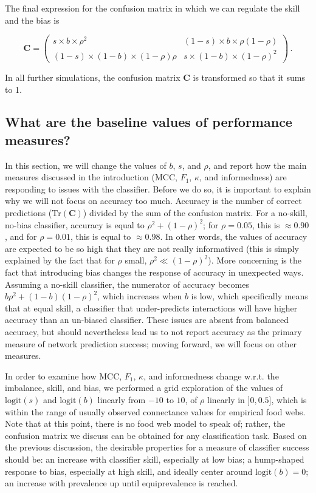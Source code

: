 \documentclass[11pt]{article}
\begin{document}
The final expression for the confusion matrix in which we can regulate
the skill and the bias is

\[
\mathbf{C} = \begin{pmatrix}
    s\times b\times \rho^2 & (1-s)\times b\times \rho (1-\rho) \\
    (1-s)\times (1-b)\times (1-\rho) \rho & s\times (1-b)\times (1-\rho)^2
\end{pmatrix} \,.
\]

In all further simulations, the confusion matrix \(\mathbf{C}\) is
transformed so that it sums to 1.

\hypertarget{what-are-the-baseline-values-of-performance-measures}{%
\subsection{What are the baseline values of performance
measures?}\label{what-are-the-baseline-values-of-performance-measures}}

In this section, we will change the values of \(b\), \(s\), and
\(\rho\), and report how the main measures discussed in the introduction
(MCC, \(F_1\), \(\kappa\), and informedness) are responding to issues
with the classifier. Before we do so, it is important to explain why we
will not focus on accuracy too much. Accuracy is the number of correct
predictions (\(\text{Tr}(\mathbf{C})\)) divided by the sum of the
confusion matrix. For a no-skill, no-bias classifier, accuracy is equal
to \(\rho^2 + (1-\rho)^2\); for \(\rho = 0.05\), this is
\(\approx 0.90\), and for \(\rho = 0.01\), this is equal to
\(\approx 0.98\). In other words, the values of accuracy are expected to
be so high that they are not really informatived (this is simply
explained by the fact that for \(\rho\) small,
\(\rho^2 \ll (1-\rho)^2\)). More concerning is the fact that introducing
bias changes the response of accuracy in unexpected ways. Assuming a
no-skill classifier, the numerator of accuracy becomes
\(b\rho^2 + (1-b)(1-\rho)^2\), which increases when \(b\) is low, which
specifically means that at equal skill, a classifier that under-predicts
interactions will have higher accuracy than an un-biased classifier.
These issues are absent from balanced accuracy, but should nevertheless
lead us to not report accuracy as the primary measure of network
prediction success; moving forward, we will focus on other measures.

In order to examine how MCC, \(F_1\), \(\kappa\), and informedness
change w.r.t. the imbalance, skill, and bias, we performed a grid
exploration of the values of \(\text{logit}(s)\) and \(\text{logit}(b)\)
linearly from \(-10\) to \(10\), of \(\rho\) linearly in \(]0, 0.5]\),
which is within the range of usually observed connectance values for
empirical food webs. Note that at this point, there is no food web model
to speak of; rather, the confusion matrix we discuss can be obtained for
any classification task. Based on the previous discussion, the desirable
properties for a measure of classifier success should be: an increase
with classifier skill, especially at low bias; a hump-shaped response to
bias, especially at high skill, and ideally center around
\(\text{logit}(b)=0\); an increase with prevalence up until
equiprevalence is reached.
\end{document}
